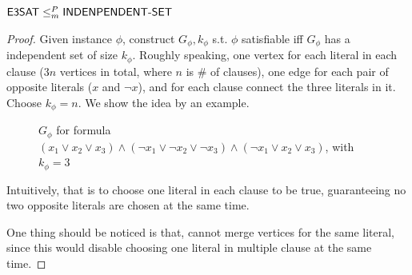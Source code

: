 \documentclass{article}
\begin{document}
\begin{theorem}
  \( \text{\sf E3SAT} \leq_m^P \text{\sf INDENPENDENT-SET} \)
\end{theorem}

\begin{proof}
  Given  instance \(\phi\), construct \(G_{\phi}, k_{\phi}\) s.t. \(\phi\) satisfiable iff \(G_{\phi}\) has a independent set of size \(k_{\phi}\). Roughly speaking,  one vertex for each literal in each clause (\(3n\) vertices in total, where \(n\) is \# of clauses), one edge for each pair of opposite literals (\(x\) and \(\neg x\)), and for each clause connect the three literals in it. Choose \(k_{\phi} = n\). We show the idea by an example.

  \begin{figure}
    \centering
    \caption{\(G_{\phi}\) for formula \((x_1 \vee x_2 \vee x_3) \wedge (\neg x_1 \vee \neg x_2 \vee \neg x_3) \wedge (\neg x_1 \vee x_2 \vee x_3)\), with \(k_{\phi} = 3\)}
  \end{figure}

  \newpage
  Intuitively, that is to choose one literal in each clause to be true, guaranteeing no two opposite literals are chosen at the same time.

  One thing should be noticed is that, cannot merge vertices for the same literal, since this would disable choosing one literal in multiple clause at the same time.
\end{proof}
\end{document}
